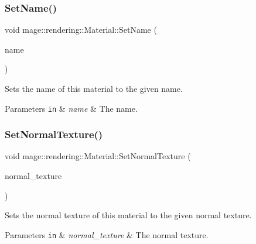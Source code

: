 \subsubsection{\texorpdfstring{Set\+Name()}{SetName()}}
{\footnotesize\ttfamily void mage\+::rendering\+::\+Material\+::\+Set\+Name (\begin{DoxyParamCaption}\item[{string}]{name }\end{DoxyParamCaption})\hspace{0.3cm}{\ttfamily [noexcept]}}

Sets the name of this material to the given name.


\begin{DoxyParams}[1]{Parameters}
\mbox{\tt in}  & {\em name} & The name. \\
\hline
\end{DoxyParams}
\hypertarget{classmage_1_1rendering_1_1_material_a1a1ae2ba12c62c1d076f04124f1f64f6}{}\label{classmage_1_1rendering_1_1_material_a1a1ae2ba12c62c1d076f04124f1f64f6} 
\subsubsection{\texorpdfstring{Set\+Normal\+Texture()}{SetNormalTexture()}}
{\footnotesize\ttfamily void mage\+::rendering\+::\+Material\+::\+Set\+Normal\+Texture (\begin{DoxyParamCaption}\item[{\hyperlink{namespacemage_1_1rendering_a6f3ae54f825328465b0cdde0f0de4a36}{Texture\+Ptr}}]{normal\+\_\+texture }\end{DoxyParamCaption})}

Sets the normal texture of this material to the given normal texture.


\begin{DoxyParams}[1]{Parameters}
\mbox{\tt in}  & {\em normal\+\_\+texture} & The normal texture. \\
\hline
\end{DoxyParams}
\hypertarget{classmage_1_1rendering_1_1_material_a23741c39e6ad9a8d12b7793bc3da4131}{}\label{classmage_1_1rendering_1_1_material_a23741c39e6ad9a8d12b7793bc3da4131} 
